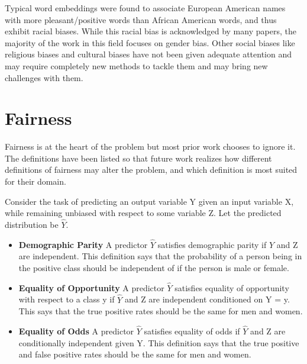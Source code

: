 \documentclass[11pt,a4paper]{article}
\begin{document}
Typical word embeddings were found to associate European American names with more pleasant/positive words than African American words, and thus exhibit racial biases. While this racial bias is acknowledged by many papers, the majority of the work in this field focuses on gender bias. Other social biases like religious biases and cultural biases have not been given adequate attention and may require completely new methods to tackle them and may bring new challenges with them.

\section{Fairness}
\label{sec:fairness}
Fairness is at the heart of the problem but most prior work chooses to ignore it. The definitions have been listed so that future work realizes how different definitions of fairness may alter the problem, and which definition is most suited for their domain.

Consider the task of predicting an output variable Y given an input variable X, while remaining unbiased with respect to some variable Z. Let the predicted distribution be $\hat{Y}$. \cite{10.1145/3278721.3278779}

\begin{itemize}
    \item \textbf{Demographic Parity} A predictor $\hat{Y}$ satisfies demographic parity if $\hat{Y}$ and Z are independent. This definition says that the probability of a person being in the positive class should be independent of if the person is male or female.
    
    \item \textbf{Equality of Opportunity} A predictor $\hat{Y}$ satisfies equality of opportunity with respect to a class y if $\hat{Y}$ and Z are independent conditioned on Y = y. This says that the true positive rates should be the same for men and women.
    
    \item \textbf{Equality of Odds} A predictor $\hat{Y}$ satisfies equality of odds if $\hat{Y}$ and Z are conditionally independent given Y. This definition says that the true positive and false positive rates should be the same for men and women.
\end{itemize}
\end{document}
